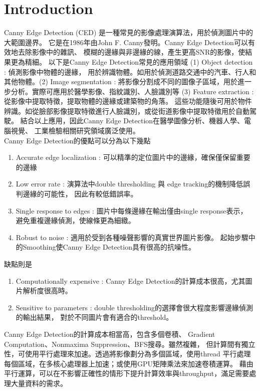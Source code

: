 \documentclass[sigconf,nonacm]{acmart}
\begin{document}
\section{Introduction}
  Canny Edge Detection (CED) 是一種常見的影像處理演算法，用於偵測圖片中的大範圍邊界。
  它是在1986年由John F. Canny發明。Canny Edge Detection可以有效地去除影像中的雜訊、
  模糊的邊緣與非邊緣的線，產生更高SNR的影像，使結果更為精細。
  以下是Canny Edge Detection常見的應用領域 (1) Object detection : 偵測影像中物體的邊緣，
  用於辨識物體。如用於偵測道路交通中的汽車、行人和其他物體。(2) Image segmentation : 
  將影像分割成不同的圖像子區域，用於進一步分析。實際可應用於醫學影像、指紋識別、人臉識別等 
  (3) Feature extraction : 從影像中提取特徵，提取物體的邊緣或建築物的角落。
  這些功能隨後可用於物件辨識。如從臉部影像提取特徵進行人臉識別，或從街道影像中提取特徵用於自動駕駛。
  結合以上應用，因此Canny Edge Detection在醫學圖像分析、機器人學、電腦視覺、
  工業檢驗相關研究領域廣泛使用。 \\
  Canny Edge Detection的優點可以分為以下幾點
  \begin{enumerate}
    \item Accurate edge localization : 可以精準的定位圖片中的邊緣，確保僅保留重要的邊緣
    \item Low error rate : 演算法中double thresholding 與 edge tracking的機制降低誤判邊緣的可能性，
    因此有較低錯誤率。
    \item Single response to edges : 圖片中每條邊緣在輸出僅由single response表示，
    避免重複邊緣偵測，使線條更為細緻。
    \item Robust to noise : 適用於受到各種噪聲影響的真實世界圖片影像。
    起始步驟中的Smoothing使Canny Edge Detection具有很高的抗噪性。
  \end{enumerate}
  缺點則是
  \begin{enumerate}
    \item Computationally expensive : Canny Edge Detection的計算成本很高，尤其圖片解析度很高時。
    \item Sensitive to parameters : double thresholding的選擇會很大程度影響邊緣偵測的輸出結果，
    對於不同圖片會有適合的threshold。
  \end{enumerate}
  Canny Edge Detection的計算成本相當高，包含多個卷積、
  Gradient Computation、Nonmaxima Suppression、BFS搜尋。雖然複雜，
  但計算間有獨立性，可使用平行處理來加速。透過將影像劃分為多個區域，使用thread
  平行處理每個區域，在多核心處理器上加速；或使用GPU矩陣乘法來加速卷積運算。
  藉由平行運算，可以在不影響正確性的情形下提升計算效率與throughput，滿足需要處理大量資料的需求。
\end{document}
